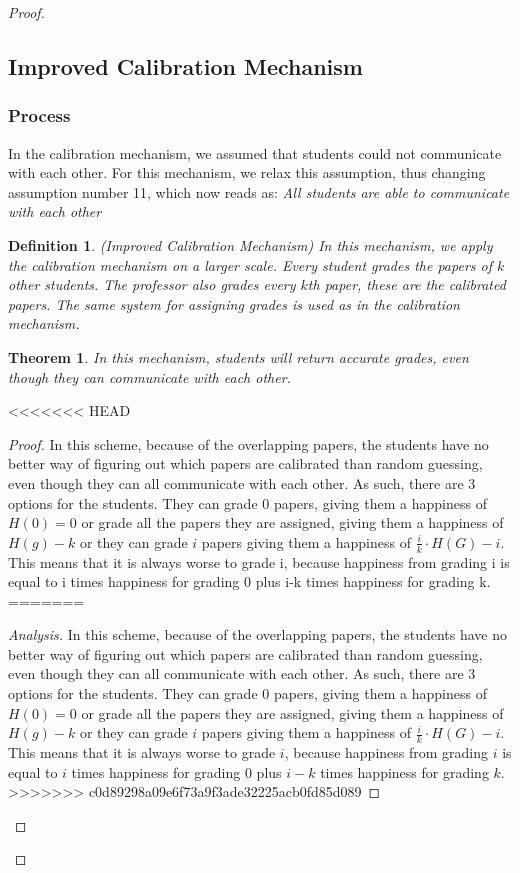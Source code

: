 \documentclass[12pt, Arial]{article}
\newtheorem{theorem}{Theorem}
\newtheorem{definition}{Definition}
\begin{document}
\begin{proof}
\subsection{Improved Calibration Mechanism}
\subsubsection{Process}
In the calibration mechanism, we assumed that students could not communicate with each other. For this mechanism, we relax this assumption, thus changing assumption number 11, which now reads as: \emph{All students are able to communicate with each other}
\begin{definition}(Improved Calibration Mechanism)
In this mechanism, we apply the calibration mechanism on a larger scale. Every student grades the papers of $k$ other students. The professor also grades every $k$th paper, these are the calibrated papers. The same system for assigning grades is used as in the calibration mechanism.
\end{definition}
\begin{theorem}
In this mechanism, students will return accurate grades, even though they can communicate with each other.
\end{theorem}
<<<<<<< HEAD
\begin{proof}
In this scheme, because of the overlapping papers, the students have no better way of figuring out which papers are calibrated than random guessing, even though they can all communicate with each other. As such, there are 3 options for the students. They can grade 0 papers, giving them a happiness of $H(0) = 0$ or grade all the papers they are assigned, giving them a happiness of $H(g) - k$ or they can grade $i$ papers giving them a happiness of $\frac{i}{k} \cdot H(G)-i$. This means that it is always worse to grade i, because happiness from grading i is equal to i times happiness for grading 0 plus i-k times happiness for grading k.
=======
\begin{proof}[Analysis]
In this scheme, because of the overlapping papers, the students have no better way of figuring out which papers are calibrated than random guessing, even though they can all communicate with each other. As such, there are 3 options for the students. They can grade 0 papers, giving them a happiness of $H(0) = 0$ or grade all the papers they are assigned, giving them a happiness of $H(g) - k$ or they can grade $i$ papers giving them a happiness of $\frac{i}{k} \cdot H(G)-i$. This means that it is always worse to grade $i$, because happiness from grading $i$ is equal to $i$ times happiness for grading 0 plus $i-k$ times happiness for grading $k$.
>>>>>>> c0d89298a09e6f73a9f3ade32225acb0fd85d089


\end{proof}
\end{proof}
\end{proof}
\end{document}
